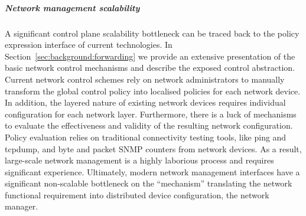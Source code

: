 
\subparagraph{Network management scalability}

A significant control plane scalability bottleneck can be traced back to the
policy expression interface of current technologies. In
Section~\ref{sec:background:forwarding} we provide an extensive presentation of
the basic network control mechanisms and describe the exposed control
abstraction.  Current network control schemes rely on network administrators to
manually transform the global control policy into localised policies for each
network device. In addition, the layered nature of existing network devices
requires individual configuration for each network layer.  Furthermore, there is
a luck of mechanisms to evaluate the effectiveness and validity of the resulting
network configuration.  Policy evaluation relies on traditional connectivity
testing tools, like ping and tcpdump, and byte and packet SNMP counters from
network devices.  As a result, large-scale network management is a highly
laborious process and requires significant experience. Ultimately, modern
network management interfaces have a significant non-scalable bottleneck on the
``mechanism'' translating the network functional requirement into distributed
device configuration, the network manager.  

